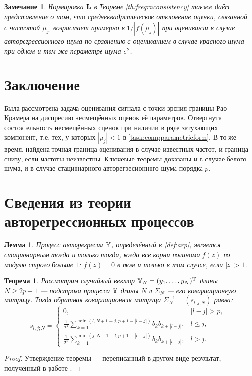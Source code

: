 \documentclass[12pt,a4paper]{article}
\newtheorem{theorem}{Теорема}
\newtheorem{lemma}{Лемма}
\newtheorem{remark}{Замечание}
\begin{document}
\begin{remark}
	Нормировка $\mathbf{L}$ в Теореме \ref{th:freqrnconsistency} также даёт представление о том, что среднеквадратическое отклонение оценки, связанной с частотой $\mu_j$, возрастает примерно в $1/|f(\mu_j)|$ при оценивании в случае авторегрессионного шума по сравнению с оцениванием в случае красного шума при одном и том же параметре шума $\sigma^2$.
\end{remark}

\section*{Заключение}
Была рассмотрена задача оценивания сигнала с точки зрения границы Рао-Крамера на диспресию несмещённых оценок её параметров. Отвергнута состоятельность несмещённых оценок при наличии в ряде затухающих компонент, т.е. тех, у которых $|\mu_j| < 1$ в \ref{task:compparametricform}. В то же время, найдена точная граница оценивания в случае известных частот, и граница снизу, если частоты неизвестны. Ключевые теоремы доказаны и в случае белого шума, и в случае стационарного авторегресионного шума порядка $p$.

\appendix
\section{Сведения из теории авторегрессионных процессов}

\begin{lemma}\label{th:stat}
	Процесс авторегресии $\mathbb{Y}$, определённый в \eqref{def:arp}, является стационарным тогда и только тогда, когда все корни полинома $f(z)$ по модулю строго больше $1$: $f(z) = 0$ в том и только в том случае, если $|z| > 1$.
\end{lemma}

\begin{theorem}\label{th:invcov}
	Рассмотрим случайный вектор $\mathbb{Y}_N = (y_1, \ldots, y_N)^{\mathrm{T}}$ длины $N \ge 2p + 1$ --- подстрока процесса $\mathbb{Y}$ длины $N$ и $\Sigma_N$ --- его ковариационную матрицу. Тогда обратная ковариационная матрица $\Sigma_N^{-1} = (s_{l, j; N})$ равна:
	\begin{equation*}
	s_{l, j; N} = \begin{cases}
	0, & |l - j| > p, \\
	\frac{1}{\sigma^2}\sum_{k = 1}^{\min(l, N + 1 - j, p + 1 - |l - j|)}b_k b_{k + |l - j|}, & l \le j, \\
	\frac{1}{\sigma^2}\sum_{k = 1}^{\min(j, N + 1 - l, p + 1 - |l - j|)}b_k b_{k + |l - j|}, & l > j.
	\end{cases}
	\end{equation*}
\end{theorem}
\begin{proof}
	Утверждение теоремы --- переписанный в другом виде результат, полученный в работе \cite{Verbyla1985}.
\end{proof}
\end{document}
